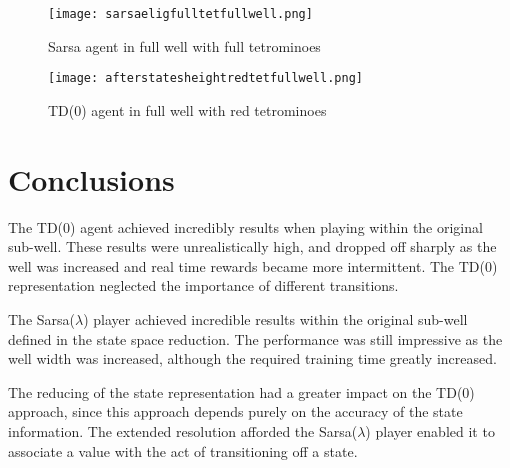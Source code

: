 \documentclass{rucsthesis}
\begin{document}
\begin{figure}[h]
\centering
\texttt{[image: sarsaeligfulltetfullwell.png]}
\caption{Sarsa agent in full well with full tetrominoes}
\label{fig:sarsaeligfulltetfullwell}
\end{figure}

\begin{figure}[h]
\centering
\texttt{[image: afterstatesheightredtetfullwell.png]}
\caption{TD(0) agent in full well with red tetrominoes}
\label{fig:afterstatesheightredtetfullwell}
\end{figure}




\chapter{Conclusions}

The TD(0) agent achieved incredibly results when playing within the original sub-well. These results were unrealistically high, and dropped off sharply as the well was increased and real time rewards became more intermittent. The TD(0) representation neglected the importance of different transitions.

The Sarsa($\lambda$) player achieved incredible results within the original sub-well defined in the state space reduction. The performance was still impressive as the well width was increased, although the required training time greatly increased.

The reducing of the state representation had a greater impact on the TD(0) approach, since this approach depends purely on the accuracy of the state information. The extended resolution afforded the Sarsa($\lambda$) player enabled it to associate a value with the act of transitioning off a state. 


\end{document}
